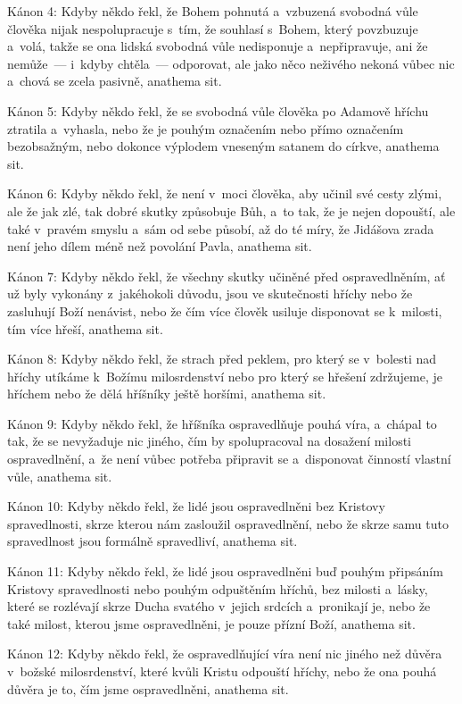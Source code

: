 \canon
Kánon 4: Kdyby někdo řekl, že Bohem pohnutá a~vzbuzená svobodná vůle člověka nijak
nespolupracuje s~tím, že souhlasí s~Bohem, který povzbuzuje a~volá, takže se ona
lidská svobodná vůle nedisponuje a~nepřipravuje, ani že nemůže~— i~kdyby chtěla~—
odporovat, ale jako něco neživého nekoná vůbec nic a~chová se zcela pasivně, anathema
sit.

\canon
Kánon 5: Kdyby někdo řekl, že se svobodná vůle člověka po Adamově hříchu ztratila
a~vyhasla, nebo že je pouhým označením nebo přímo označením bezobsažným, nebo dokonce
výplodem vneseným satanem do církve, anathema sit.

\canon
Kánon 6: Kdyby někdo řekl, že není v~moci člověka, aby učinil své cesty zlými, ale
že jak zlé, tak dobré skutky způsobuje Bůh, a~to tak, že je nejen dopouští, ale také
v~pravém smyslu a~sám od sebe působí, až do té míry, že Jidášova zrada není jeho
dílem méně než povolání Pavla, anathema sit.

\canon
Kánon 7: Kdyby někdo řekl, že všechny skutky učiněné před ospravedlněním, ať už byly
vykonány z~jakéhokoli důvodu, jsou ve skutečnosti hříchy nebo že zasluhují Boží nenávist,
nebo že čím více člověk usiluje disponovat se k~milosti, tím více hřeší, anathema
sit.

\canon
Kánon 8: Kdyby někdo řekl, že strach před peklem, pro který se v~bolesti nad hříchy
utíkáme k~Božímu milosrdenství nebo pro který se hřešení zdržujeme, je hříchem nebo
že dělá hříšníky ještě horšími, anathema sit.

\canon
Kánon 9: Kdyby někdo řekl, že hříšníka ospravedlňuje pouhá víra, a~chápal to tak,
že se nevyžaduje nic jiného, čím by spolupracoval na dosažení milosti ospravedlnění,
a~že není vůbec potřeba připravit se a~disponovat činností vlastní vůle, anathema
sit.

\canon
Kánon 10: Kdyby někdo řekl, že lidé jsou ospravedlněni bez Kristovy spravedlnosti,
skrze kterou nám zasloužil ospravedlnění, nebo že skrze samu tuto spravedlnost jsou
formálně spravedliví, anathema sit.

\canon
Kánon 11: Kdyby někdo řekl, že lidé jsou ospravedlněni buď pouhým připsáním Kristovy
spravedlnosti nebo pouhým odpuštěním hříchů, bez milosti a~lásky, které se rozlévají
skrze Ducha svatého v~jejich srdcích a~pronikají je, nebo že také milost, kterou
jsme ospravedlněni, je pouze přízní Boží, anathema sit.

\canon
Kánon 12: Kdyby někdo řekl, že ospravedlňující víra není nic jiného než důvěra v~božské
milosrdenství, které kvůli Kristu odpouští hříchy, nebo že ona pouhá důvěra je to,
čím jsme ospravedlněni, anathema sit.

